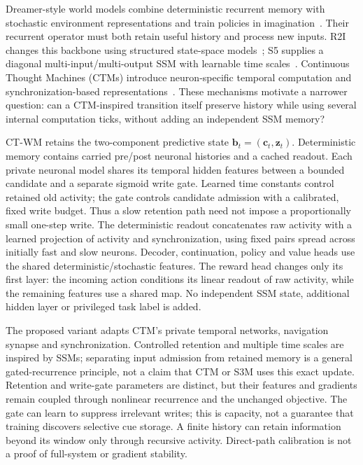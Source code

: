 \documentclass{article}
\begin{document}
Dreamer-style world models combine deterministic recurrent memory with stochastic environment representations and train policies in imagination~\cite{hafner2023mastering}. Their recurrent operator must both retain useful history and process new inputs. R2I changes this backbone using structured state-space models~\cite{samsami2024mastering}; S5 supplies a diagonal multi-input/multi-output SSM with learnable time scales~\cite{smith2023simplified}. Continuous Thought Machines (CTMs) introduce neuron-specific temporal computation and synchronization-based representations~\cite{darlow2025continuous}. These mechanisms motivate a narrower question: can a CTM-inspired transition itself preserve history while using several internal computation ticks, without adding an independent SSM memory?

CT-WM retains the two-component predictive state $\mathbf b_t=(\mathbf c_t,\mathbf z_t)$. Deterministic memory contains carried pre/post neuronal histories and a cached readout. Each private neuronal model shares its temporal hidden features between a bounded candidate and a separate sigmoid write gate. Learned time constants control retained old activity; the gate controls candidate admission with a calibrated, fixed write budget. Thus a slow retention path need not impose a proportionally small one-step write. The deterministic readout concatenates raw activity with a learned projection of activity and synchronization, using fixed pairs spread across initially fast and slow neurons. Decoder, continuation, policy and value heads use the shared deterministic/stochastic features. The reward head changes only its first layer: the incoming action conditions its linear readout of raw activity, while the remaining features use a shared map. No independent SSM state, additional hidden layer or privileged task label is added.

The proposed variant adapts CTM's private temporal networks, navigation synapse and synchronization. Controlled retention and multiple time scales are inspired by SSMs; separating input admission from retained memory is a general gated-recurrence principle, not a claim that CTM or S3M uses this exact update. Retention and write-gate parameters are distinct, but their features and gradients remain coupled through nonlinear recurrence and the unchanged objective. The gate can learn to suppress irrelevant writes; this is capacity, not a guarantee that training discovers selective cue storage. A finite history can retain information beyond its window only through recursive activity. Direct-path calibration is not a proof of full-system or gradient stability.
\end{document}
